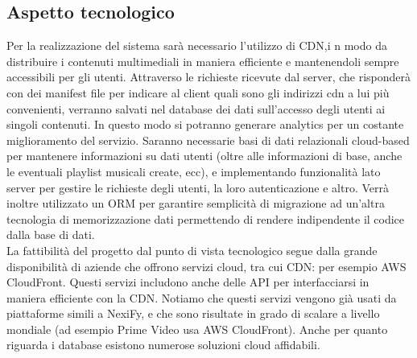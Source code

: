 \subsection{Aspetto tecnologico}
Per la realizzazione del sistema sarà necessario l'utilizzo di CDN,i
n modo da distribuire i contenuti multimediali in maniera efficiente e mantenendoli
sempre accessibili per gli utenti. Attraverso le richieste ricevute dal server, che risponderà con dei manifest file per indicare al client quali sono gli indirizzi cdn a lui più convenienti, verranno salvati nel database dei dati sull’accesso degli utenti ai singoli contenuti. In questo modo si potranno generare analytics per un costante miglioramento del servizio. Saranno necessarie basi di dati relazionali cloud-based per mantenere informazioni su dati utenti (oltre alle informazioni di base, anche le eventuali playlist musicali create, ecc), e implementando funzionalità lato server per gestire le richieste degli utenti, la loro autenticazione e altro. Verrà inoltre utilizzato un ORM per garantire semplicità di migrazione ad un'altra tecnologia di memorizzazione dati permettendo di rendere indipendente il codice dalla base di dati.\\
La fattibilità del progetto dal punto di vista tecnologico segue dalla grande disponibilità di aziende che offrono servizi cloud, tra cui CDN: per esempio AWS CloudFront. Questi servizi includono anche delle API per interfacciarsi in maniera efficiente con la CDN. Notiamo che questi servizi vengono già usati da piattaforme simili a NexiFy, e che sono risultate in grado di scalare a livello mondiale (ad esempio Prime Video usa AWS CloudFront). Anche per quanto riguarda i database esistono numerose soluzioni cloud affidabili.



